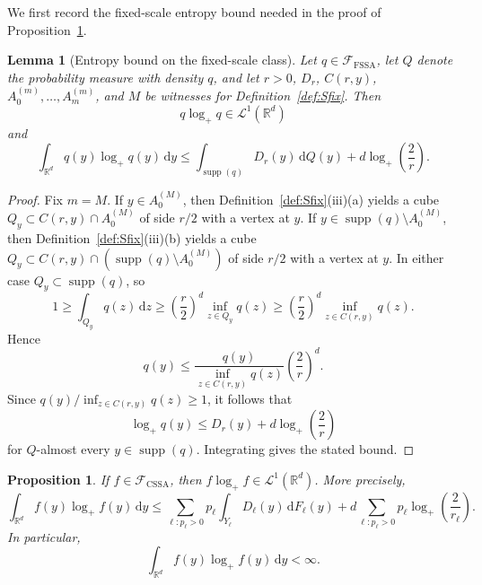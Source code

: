 \documentclass[11pt]{article}
\newtheorem{proposition}[theorem]{Proposition}
\newtheorem{lemma}[theorem]{Lemma}
\theoremstyle{definition}
\begin{document}
We first record the fixed-scale entropy bound needed in the proof of Proposition~\ref{prop:Scnt-entropy}.

\begin{lemma}[Entropy bound on the fixed-scale class]
\label{lem:Sfix-entropy}
Let $q\in\mathcal F_{\mathrm{FSSA}}$, let $Q$ denote the probability measure with density $q$, and let $r>0$, $D_r$, $C(r,y)$, $A^{(m)}_0,\dots,A^{(m)}_m$, and $M$ be witnesses for Definition~\ref{def:Sfix}. Then
\[
q\log_+ q\in \mathcal L^1(\mathbb{R}^d)
\]
and
\[
\int_{\mathbb{R}^d} q(y)\log_+ q(y)\,\mathrm{d}y
\le
\int_{\operatorname{supp}(q)} D_r(y)\,\mathrm{d}Q(y)+d\log_+\!\left(\frac{2}{r}\right).
\]
\end{lemma}

\begin{proof}
Fix $m=M$. If $y\in A^{(M)}_0$, then Definition~\ref{def:Sfix}\textnormal{(iii)(a)} yields a cube $Q_y\subset C(r,y)\cap A^{(M)}_0$ of side $r/2$ with a vertex at $y$. If $y\in \operatorname{supp}(q)\setminus A^{(M)}_0$, then Definition~\ref{def:Sfix}\textnormal{(iii)(b)} yields a cube $Q_y\subset C(r,y)\cap \left(\operatorname{supp}(q)\setminus A^{(M)}_0\right)$ of side $r/2$ with a vertex at $y$. In either case $Q_y\subset \operatorname{supp}(q)$, so
\[
1\ge \int_{Q_y} q(z)\,\mathrm{d}z
\ge \left(\frac{r}{2}\right)^d\inf_{z\in Q_y} q(z)
\ge \left(\frac{r}{2}\right)^d\inf_{z\in C(r,y)} q(z).
\]
Hence
\[
q(y)\le \frac{q(y)}{\inf_{z\in C(r,y)}q(z)}\left(\frac{2}{r}\right)^d.
\]
Since $q(y)/\inf_{z\in C(r,y)}q(z)\ge1$, it follows that
\[
\log_+ q(y)\le D_r(y)+d\log_+\!\left(\frac{2}{r}\right)
\]
for $Q$-almost every $y\in \operatorname{supp}(q)$. Integrating gives the stated bound.
\end{proof}


\begin{proposition}
\label{prop:Scnt-entropy}
If $f\in\mathcal F_{\mathrm{CSSA}}$, then $f\log_+f\in \mathcal L^1(\mathbb{R}^d)$. More precisely,
\[
\int_{\mathbb{R}^d} f(y)\log_+ f(y)\,\mathrm{d}y
\le
\sum_{\ell:p_\ell>0} p_\ell\int_{Y_\ell} D_\ell(y)\,\mathrm{d}F_\ell(y)
+d\sum_{\ell:p_\ell>0} p_\ell\log_+\!\left(\frac{2}{r_\ell}\right).
\]
In particular,
\[
\int_{\mathbb{R}^d} f(y)\log_+ f(y)\,\mathrm{d}y<\infty.
\]
\end{proposition}
\end{document}
